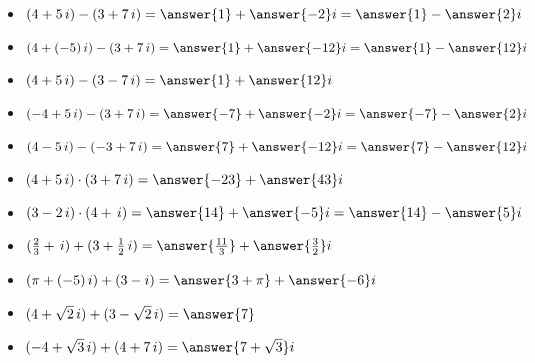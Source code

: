 \documentclass{ximera}
\begin{document}
\begin{question}


\begin{itemize}
\item   $(4 + 5 \, i) - (3 + 7 \, i) = \answer{1} + \answer{-2} i = \answer{1} - \answer{2} i$
\item   $(4 + (-5) \, i) - (3 + 7 \, i) = \answer{1} + \answer{-12} i = \answer{1} - \answer{12} i$
\item   $(4 + 5 \, i) - (3 - 7 \, i) = \answer{1} + \answer{12} i$
\item   $(-4 + 5 \, i) - (3 + 7 \, i) = \answer{-7} + \answer{-2} i = \answer{-7} - \answer{2} i$
\item   $(4 - 5 \, i) - (-3 + 7 \, i) = \answer{7} + \answer{-12} i = \answer{7} - \answer{12} i$
\end{itemize}



\end{question}











\begin{question}


\begin{itemize}
\item   $(4 + 5 \, i) \cdot (3 + 7 \, i) = \answer{-23} + \answer{43} i$
\item   $(3 - 2 \, i) \cdot (4 + \, i) = \answer{14} + \answer{-5} i = \answer{14} - \answer{5} i$
\end{itemize}



\end{question}








\begin{question}


\begin{itemize}
\item   $(\frac{2}{3} +  \, i) + (3 + \frac{1}{2} \, i) = \answer{\frac{11}{3}} + \answer{\frac{3}{2}} i$
\item   $(\pi + (-5) \, i) + (3 - i) = \answer{3+\pi} + \answer{-6} i$
\item   $(4 + \sqrt{2} \, i) + (3 - \sqrt{2} \, i) = \answer{7}$
\item   $(-4 + \sqrt{3} \, i) + (4 + 7 \, i) = \answer{7 + \sqrt{3}} i$
\end{itemize}



\end{question}
\end{document}
